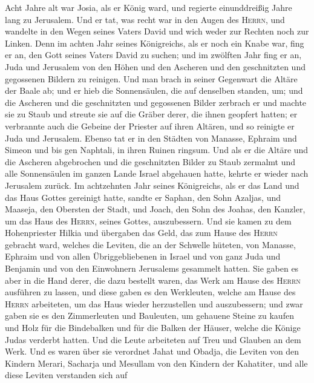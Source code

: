 Acht Jahre alt war Josia, als er König ward, und regierte
einunddreißig Jahre lang zu Jerusalem.  Und er tat, was
recht war in den Augen des \textsc{Herrn}, und wandelte in den Wegen
seines Vaters David und wich weder zur Rechten noch zur Linken.
 Denn im achten Jahr seines Königreichs, als er noch ein
Knabe war, fing er an, den Gott seines Vaters David zu suchen; und im
zwölften Jahr fing er an, Juda und Jerusalem von den Höhen und den
Ascheren und den geschnitzten und gegossenen Bildern zu reinigen.
 Und man brach in seiner Gegenwart die Altäre der Baale
ab; und er hieb die Sonnensäulen, die auf denselben standen, um; und die
Ascheren und die geschnitzten und gegossenen Bilder zerbrach er und
machte sie zu Staub und streute sie auf die Gräber derer, die ihnen
geopfert hatten;  er verbrannte auch die Gebeine der
Priester auf ihren Altären, und so reinigte er Juda und Jerusalem.
 Ebenso tat er in den Städten von Manasse, Ephraim und
Simeon und bis gen Naphtali, in ihren Ruinen ringsum.  Und
als er die Altäre und die Ascheren abgebrochen und die geschnitzten
Bilder zu Staub zermalmt und alle Sonnensäulen im ganzen Lande Israel
abgehauen hatte, kehrte er wieder nach Jerusalem zurück. 
Im achtzehnten Jahr seines Königreichs, als er das Land und das Haus
Gottes gereinigt hatte, sandte er Saphan, den Sohn Azaljas, und Maaseja,
den Obersten der Stadt, und Joach, den Sohn des Joahas, den Kanzler, um
das Haus des \textsc{Herrn}, seines Gottes, auszubessern. 
Und sie kamen zu dem Hohenpriester Hilkia und übergaben das Geld, das
zum Hause des \textsc{Herrn} gebracht ward, welches die Leviten, die an
der Schwelle hüteten, von Manasse, Ephraim und von allen
Übriggebliebenen in Israel und von ganz Juda und Benjamin und von den
Einwohnern Jerusalems gesammelt hatten.  Sie gaben es
aber in die Hand derer, die dazu bestellt waren, das Werk am Hause des
\textsc{Herrn} ausführen zu lassen, und diese gaben es den Werkleuten,
welche am Hause des \textsc{Herrn} arbeiteten, um das Haus wieder
herzustellen und auszubessern;  und zwar gaben sie es den
Zimmerleuten und Bauleuten, um gehauene Steine zu kaufen und Holz für
die Bindebalken und für die Balken der Häuser, welche die Könige Judas
verderbt hatten.  Und die Leute arbeiteten auf Treu und
Glauben an dem Werk. Und es waren über sie verordnet Jahat und Obadja,
die Leviten von den Kindern Merari, Sacharja und Mesullam von den
Kindern der Kahatiter, und alle diese Leviten verstanden sich auf
